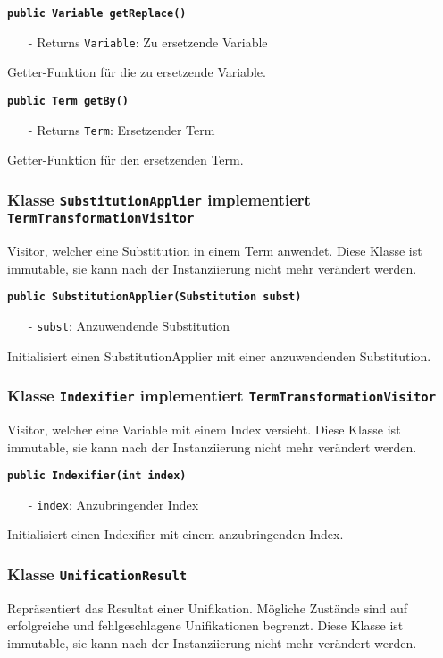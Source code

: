 \documentclass[parskip=full,11pt,twoside]{scrartcl}
\begin{document}
\textbf{\texttt{public Variable getReplace()}}
\begin{itemize}[noitemsep]
	\item[-] Returns \texttt{Variable}: Zu ersetzende Variable
\end{itemize}
Getter-Funktion für die zu ersetzende Variable.

\textbf{\texttt{public Term getBy()}}
\begin{itemize}[noitemsep]
	\item[-] Returns \texttt{Term}: Ersetzender Term
\end{itemize}
Getter-Funktion für den ersetzenden Term.

\subsubsection{Klasse \texttt{SubstitutionApplier} implementiert \texttt{TermTransformationVisitor}}
Visitor, welcher eine Substitution in einem Term anwendet. Diese Klasse ist immutable, sie kann nach der Instanziierung nicht mehr verändert werden.

\textbf{\texttt{public SubstitutionApplier(Substitution subst)}}
\begin{itemize}[noitemsep]
	\item[-] \texttt{subst}: Anzuwendende Substitution
\end{itemize}
Initialisiert einen SubstitutionApplier mit einer anzuwendenden Substitution.

\subsubsection{Klasse \texttt{Indexifier} implementiert \texttt{TermTransformationVisitor}}
Visitor, welcher eine Variable mit einem Index versieht. Diese Klasse ist immutable, sie kann nach der Instanziierung nicht mehr verändert werden.

\textbf{\texttt{public Indexifier(int index)}}
\begin{itemize}[noitemsep]
	\item[-] \texttt{index}: Anzubringender Index
\end{itemize}
Initialisiert einen Indexifier mit einem anzubringenden Index.
\subsubsection{Klasse \texttt{UnificationResult}}
Repräsentiert das Resultat einer Unifikation. Mögliche Zustände sind auf erfolgreiche und fehlgeschlagene Unifikationen begrenzt. Diese Klasse ist immutable, sie kann nach der Instanziierung nicht mehr verändert werden.
\end{document}

